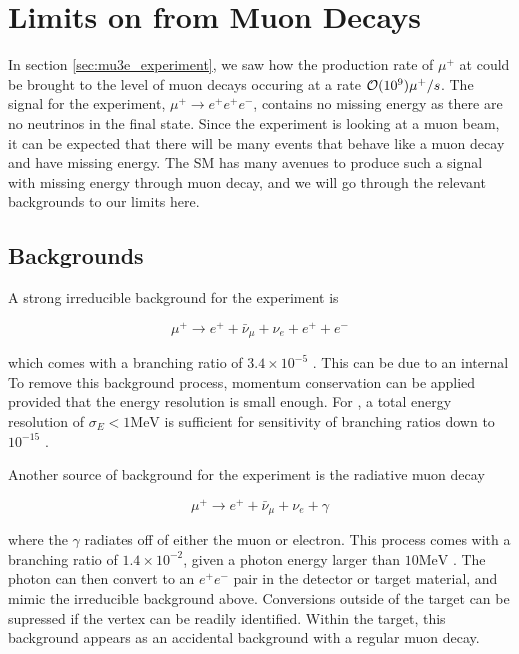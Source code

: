\section{Limits on \mueee from Muon Decays}
In section \ref{sec:mu3e_experiment}, we saw how the production rate of $\mu^+$ at \mueee could be brought to the level of muon decays occuring at a rate $\operatorname{\mathcal{O}}(10^9) \mu^+/s$.
The signal for the \mueee experiment, $\mu^+ \rightarrow e^+ e^+ e^-$, contains no missing energy as there are no neutrinos in the final state.
Since the experiment is looking at a muon beam, it can be expected that there will be many events that behave like a muon decay and have missing energy.
The SM has many avenues to produce such a signal with missing energy through muon decay, and we will go through the relevant backgrounds to our limits here.

\subsection{Backgrounds}
A strong irreducible background for the experiment is

\begin{equation}
    \mu^+ \rightarrow e^+ + \bar{\nu}_\mu + \nu_e + e^+ + e^-
\end{equation}

\noindent which comes with a branching ratio of $3.4 \times 10^{-5}$ \cite{Agashe:2014kda}. 
This can be due to an internal 
To remove this background process, momentum conservation can be applied provided that the energy resolution is small enough.
For \mueee, a total energy resolution of $\sigma_E < 1\textrm{MeV}$ is sufficient for sensitivity of branching ratios down to $10^{-15}$ \cite{Blondel:2013ia}.

Another source of background for the experiment is the radiative muon decay

\begin{equation}
    \mu^+ \rightarrow e^+ + \bar{\nu}_\mu + \nu_e + \gamma
\end{equation}

\noindent where the $\gamma$ radiates off of either the muon or electron.
This process comes with a branching ratio of $1.4 \times 10^{-2}$, given a photon energy larger than $10\textrm{MeV}$ \cite{Agashe:2014kda}.
The photon can then convert to an $e^+ e^-$ pair in the detector or target material, and mimic the irreducible background above.
Conversions outside of the target can be supressed if the vertex can be readily identified.
Within the target, this background appears as an accidental background with a regular muon decay.
